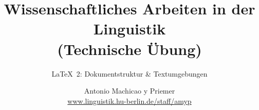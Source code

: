 


\title{
	Wissenschaftliches Arbeiten in der Linguistik\\
	(Technische Übung)
}

\subtitle{\LaTeX\ 2: Dokumentstruktur \& Textumgebungen}

\author[aMyP]{
	{\small Antonio Machicao y Priemer}
	\\
	{\footnotesize \url{www.linguistik.hu-berlin.de/staff/amyp}}
}


\date{ }






\begin{frame}
  \HUtitle
\end{frame}





\nocite{Freitag&MyP15a}
\nocite{Knuth1986}
\nocite{Kopka94a}
\nocite{MyP17c}
\nocite{MyP&Kerkhof16a}
	



